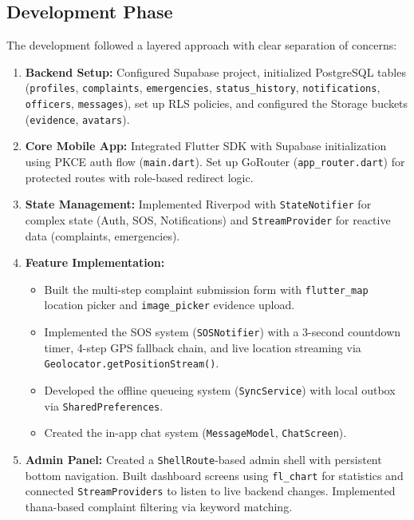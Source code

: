 \documentclass[12pt, a4paper, twoside, openany]{report}
\begin{document}
\subsection{Development Phase}
The development followed a layered approach with clear separation of concerns:
\begin{enumerate}
    \item[] \textbf{Backend Setup:} Configured Supabase project, initialized PostgreSQL tables (\texttt{profiles}, \texttt{complaints}, \texttt{emergencies}, \texttt{status\_history}, \texttt{notifications}, \texttt{officers}, \texttt{messages}), set up RLS policies, and configured the Storage buckets (\texttt{evidence}, \texttt{avatars}).
    \item[] \textbf{Core Mobile App:} Integrated Flutter SDK with Supabase initialization using PKCE auth flow (\texttt{main.dart}). Set up GoRouter (\texttt{app\_router.dart}) for protected routes with role-based redirect logic.
    \item[] \textbf{State Management:} Implemented Riverpod with \texttt{StateNotifier} for complex state (Auth, SOS, Notifications) and \texttt{StreamProvider} for reactive data (complaints, emergencies).
    \item[] \textbf{Feature Implementation:}
    \begin{itemize}
        \item Built the multi-step complaint submission form with \texttt{flutter\_map} location picker and \texttt{image\_picker} evidence upload.
        \item Implemented the SOS system (\texttt{SOSNotifier}) with a 3-second countdown timer, 4-step GPS fallback chain, and live location streaming via \texttt{Geolocator.getPositionStream()}.
        \item Developed the offline queueing system (\texttt{SyncService}) with local outbox via \texttt{SharedPreferences}.
        \item Created the in-app chat system (\texttt{MessageModel}, \texttt{ChatScreen}).
    \end{itemize}
    \item[] \textbf{Admin Panel:} Created a \texttt{ShellRoute}-based admin shell with persistent bottom navigation. Built dashboard screens using \texttt{fl\_chart} for statistics and connected \texttt{StreamProviders} to listen to live backend changes. Implemented thana-based complaint filtering via keyword matching.
\end{enumerate}
\end{document}
